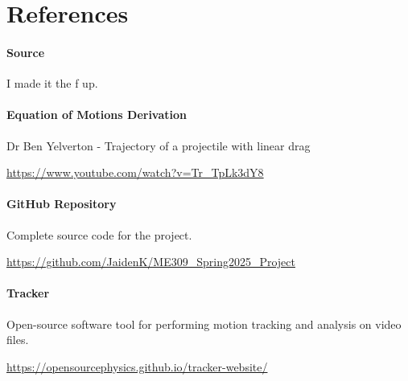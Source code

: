 \section{References}

\paragraph{Source} 

I made it the f up.

\paragraph{Equation of Motions Derivation} 

Dr Ben Yelverton - Trajectory of a projectile with linear drag

\href{https://www.youtube.com/watch?v=Tr\_TpLk3dY8}{https://www.youtube.com/watch?v=Tr\_TpLk3dY8}

\paragraph{GitHub Repository} 

Complete source code for the project. 

\href{https://github.com/JaidenK/ME309\_Spring2025\_Project}{https://github.com/JaidenK/ME309\_Spring2025\_Project}

\paragraph{Tracker} 

Open-source software tool for performing motion tracking and analysis on video files.

\href{https://opensourcephysics.github.io/tracker-website/}{https://opensourcephysics.github.io/tracker-website/}
